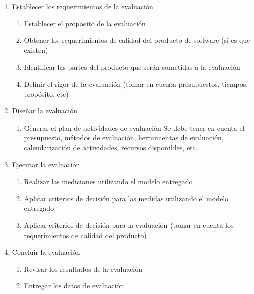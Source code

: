 \begin{enumerate}
    \item Establecer los requerimientos de la evaluación
        \begin{enumerate}
                \item Establecer el propósito de la evaluación
                \item Obtener los requerimientos de calidad del producto de software (si es que existen)
                \item Identificar las partes del producto que serán sometidas a la evaluación
                \item Definir el rigor de la evaluación (tomar en cuenta presupuestos, tiempos, propósito, etc)
        \end{enumerate}
    \item Diseñar la evaluación
        \begin{enumerate}
                \item Generar el plan de actividades de evaluación
                    Se debe tener en cuenta el presupuesto, métodos de evaluación, herramientas de evaluación, 
                    calendarización de actividades, recursos disponibles, etc.
        \end{enumerate}
    \item Ejecutar la evaluación
        \begin{enumerate}
                \item Realizar las mediciones utilizando el modelo entregado
                \item Aplicar criterios de decisión para las medidas utilizando el modelo entregado
                \item Aplicar criterios de decisión para la evaluación (tomar en cuenta los requerimientos de calidad
                    del producto)
        \end{enumerate}
    \item Concluir la evaluación
        \begin{enumerate}
            \item Revisar los resultados de la evaluación
            \item Entregar los datos de evaluación
        \end{enumerate}
\end{enumerate}

